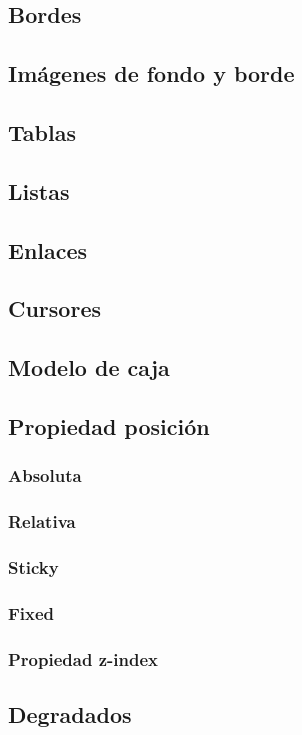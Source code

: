 \documentclass[12pt]{report}
\begin{document}
		\subsection{Bordes}
		\subsection{Imágenes de fondo y borde}
		\subsection{Tablas}
		\subsection{Listas}
		\subsection{Enlaces}
		\subsection{Cursores}
		\subsection{Modelo de caja}
		\subsection{Propiedad posición}
			\subsubsection{Absoluta}
			\subsubsection{Relativa}
			\subsubsection{Sticky}
			\subsubsection{Fixed}
			\subsubsection{Propiedad z-index}
		\subsection{Degradados}
\end{document}
